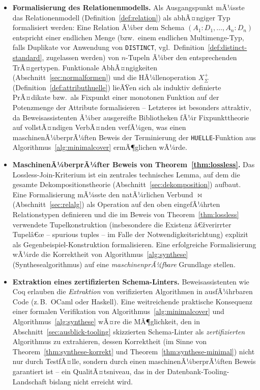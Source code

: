 ﻿\documentclass[a4paper,12pt]{report}
\theoremstyle{definition}
\theoremstyle{remark}
\begin{document}
\begin{itemize}
  \item \textbf{Formalisierung des Relationenmodells.} Als
    Ausgangspunkt mÃ¼sste das Relationenmodell
    (Definition~\ref{def:relation}) als abhÃ¤ngiger Typ formalisiert
    werden: Eine Relation Ã¼ber dem Schema $(A_1{:}D_1,\ldots,A_n{:}D_n)$
    entspricht einer endlichen Menge (bzw.\ einem endlichen
    Multimenge-Typ, falls Duplikate vor Anwendung von
    \texttt{DISTINCT}, vgl.\ Definition~\ref{def:distinct-standard},
    zugelassen werden) von $n$-Tupeln Ã¼ber den entsprechenden
    TrÃ¤gertypen. Funktionale AbhÃ¤ngigkeiten
    (Abschnitt~\ref{sec:normalformen}) und die HÃ¼llenoperation
    $X^+_\Sigma$ (Definition~\ref{def:attributhuelle}) lieÃŸen sich
    als induktiv definierte PrÃ¤dikate bzw.\ als Fixpunkt einer
    monotonen Funktion auf der Potenzmenge der Attribute formalisieren
    -- Letzteres ist besonders attraktiv, da Beweisassistenten Ã¼ber
    ausgereifte Bibliotheken fÃ¼r Fixpunkttheorie auf vollstÃ¤ndigen
    VerbÃ¤nden verfÃ¼gen, was einen maschinenÃ¼berprÃ¼ften Beweis der
    Terminierung der \texttt{HUELLE}-Funktion aus
    Algorithmus~\ref{alg:minimalcover} ermÃ¶glichen wÃ¼rde.

  \item \textbf{MaschinenÃ¼berprÃ¼fter Beweis von
    Theorem~\ref{thm:lossless}.} Das
    Lossless-Join-Kriterium ist ein zentrales technisches Lemma, auf
    dem die gesamte Dekompositionstheorie
    (Abschnitt~\ref{sec:dekomposition}) aufbaut. Eine Formalisierung
    mÃ¼sste den natÃ¼rlichen Verbund $\Join$
    (Abschnitt~\ref{sec:relalg}) als Operation auf den oben
    eingefÃ¼hrten Relationstypen definieren und die im
    Beweis von Theorem~\ref{thm:lossless} verwendete
    Tupelkonstruktion (insbesondere die Existenz â€žverirrter
    Tupelâ€œ -- spurious tuples -- im Falle der Notwendigkeitsrichtung)
    explizit als Gegenbeispiel-Konstruktion formalisieren. Eine
    erfolgreiche Formalisierung wÃ¼rde die Korrektheit von
    Algorithmus~\ref{alg:synthese} (Synthesealgorithmus) auf eine
    \emph{maschinenprÃ¼fbare} Grundlage stellen.

  \item \textbf{Extraktion eines zertifizierten
    Schema-Linters.} Beweisassistenten wie Coq erlauben die
    \emph{Extraktion} von verifizierten Algorithmen in
    ausfÃ¼hrbaren Code (z.\,B.\ OCaml oder Haskell). Eine
    weitreichende praktische Konsequenz einer formalen Verifikation
    von Algorithmus~\ref{alg:minimalcover} und
    Algorithmus~\ref{alg:synthese} wÃ¤re die MÃ¶glichkeit, den in
    Abschnitt~\ref{sec:ausblick-tooling} skizzierten Schema-Linter
    als \emph{zertifizierten} Algorithmus zu extrahieren, dessen
    Korrektheit (im Sinne von
    Theorem~\ref{thm:synthese-korrekt} und
    Theorem~\ref{thm:synthese-minimal}) nicht nur durch
    TestfÃ¤lle, sondern durch einen maschinenÃ¼berprÃ¼ften Beweis
    garantiert ist -- ein QualitÃ¤tsniveau, das in der
    Datenbank-Tooling-Landschaft bislang nicht erreicht wird.


\end{itemize}
\end{document}

